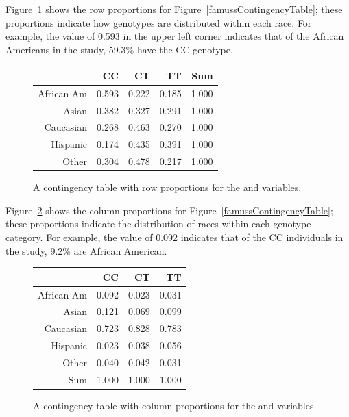 Figure~\ref{famussRowPropTable} shows the row proportions for Figure~\ref{famussContingencyTable}; these proportions indicate how genotypes are distributed within each race. For example, the value of 0.593 in the upper left corner indicates that of the African Americans in the study, 59.3\% have the CC genotype.


\begin{figure}[ht]
	\centering
	\begin{tabular}{rrrrr}
		\hline
		& CC & CT & TT & Sum \\ 
		\hline
		African Am & 0.593 & 0.222 & 0.185 & 1.000 \\ 
		Asian & 0.382 & 0.327 & 0.291 & 1.000 \\ 
		Caucasian & 0.268 & 0.463 & 0.270 & 1.000 \\ 
		Hispanic & 0.174 & 0.435 & 0.391 & 1.000 \\ 
		Other & 0.304 & 0.478 & 0.217 & 1.000 \\ 
		\hline
	\end{tabular}
	\caption{A contingency table with row proportions for the  and  variables.} 
	\label{famussRowPropTable}
\end{figure}


Figure~\ref{famussColPropTable} shows the column proportions for Figure~\ref{famussContingencyTable}; these proportions indicate the distribution of races within each genotype category. For example, the value of 0.092 indicates that of the CC individuals in the study, 9.2\% are African American. 


\begin{figure}[ht]
	\centering
	\begin{tabular}{rrrr}
		\hline
		& CC & CT & TT \\ 
		\hline
		African Am & 0.092 & 0.023 & 0.031 \\ 
		Asian & 0.121 & 0.069 & 0.099 \\ 
		Caucasian & 0.723 & 0.828 & 0.783 \\ 
		Hispanic & 0.023 & 0.038 & 0.056 \\ 
		Other & 0.040 & 0.042 & 0.031 \\ 
		Sum & 1.000 & 1.000 & 1.000 \\
		\hline
	\end{tabular}
	\caption{A contingency table with column proportions for the  and  variables.} 
	\label{famussColPropTable}
\end{figure}

